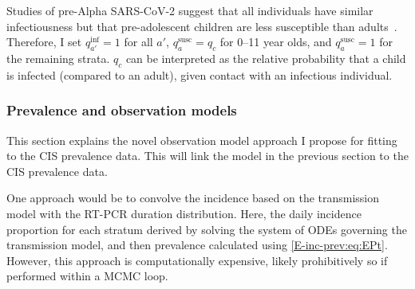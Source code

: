 \documentclass[thesis.tex]{subfiles}
\begin{document}

Studies of pre-Alpha SARS-CoV-2 suggest that all individuals have similar infectiousness but that pre-adolescent children are less susceptible than adults~\autocite{chenRole,vinerTransmission}.
Therefore, I set $q^\text{inf}_{a'} = 1$ for all $a'$, $q^\text{susc}_{a} = q_c$ for 0--11 year olds, and $q^\text{susc}_{a} = 1$ for the remaining strata.
$q_c$ can be interpreted as the relative probability that a child is infected (compared to an adult), given contact with an infectious individual.

\subsubsection{Prevalence and observation models} \label{SEIR:sec:observation}

This section  explains the novel observation model approach I propose for fitting to the CIS prevalence data.
This will link the model in the previous section to the CIS prevalence data.

One approach would be to convolve the incidence based on the transmission model with the RT-PCR duration distribution.
Here, the daily incidence proportion for each stratum derived by solving the system of ODEs governing the transmission model, and then prevalence calculated using \cref{E-inc-prev:eq:EPt}.
However, this approach is computationally expensive, likely prohibitively so if performed within a MCMC loop.
\end{document}
